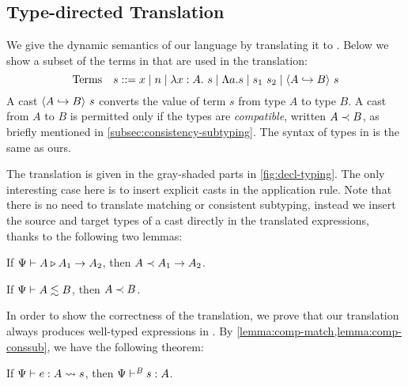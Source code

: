 \renewcommand{\trto}[1]{\rightsquigarrow{#1}}
\subsection{Type-directed Translation}
\label{sec:type:trans}

We give the dynamic semantics of our language by translating it to \pbc. Below
we show a subset of the terms in \pbc that are used in the translation:
\[
  \text{Terms}\quad s ::= x \mid n \mid \lambda x:A.~ s \mid \Lambda a. s \mid s_1~s_2 \mid \langle A \hookrightarrow B \rangle ~ s
\]
A cast $\langle A \hookrightarrow B \rangle ~ {s}$ converts the value of term $s$ from type $A$ to type $B$.
A cast from $A$ to $B$ is permitted only if the types are \textit{compatible},
written $A \prec B$, as briefly mentioned in
\cref{subsec:consistency-subtyping}. The syntax of types in \pbc is the
same as ours.

The translation is given in the gray-shaded parts in \cref{fig:decl-typing}. The
only interesting case here is to insert explicit casts in the application rule.
Note that there is no need to translate matching or consistent subtyping,
instead we insert the source and target types of a cast directly in the
translated expressions, thanks to the following two lemmas:

\begin{clemma}%
  \label{lemma:comp-match}
  If $\Psi {} \vdash A \triangleright A_1 \to A_2$, then $A \prec A_1 \to A_2$.
\end{clemma}

\begin{clemma}%
  \label{lemma:comp-conssub}
  If $\Psi {} \vdash A \lesssim B$, then $A \prec B$.
\end{clemma}

In order to show the correctness of the translation, we prove that our
translation always produces well-typed expressions in \pbc. By
\cref{lemma:comp-match,lemma:comp-conssub}, we have the following theorem:

\begin{ctheorem}
  \label{lemma:type-safety}
  If $\tpreinf e : A \trto s$, then $\Psi \vdash^{\mathit{B}} s : A$.
\end{ctheorem}

